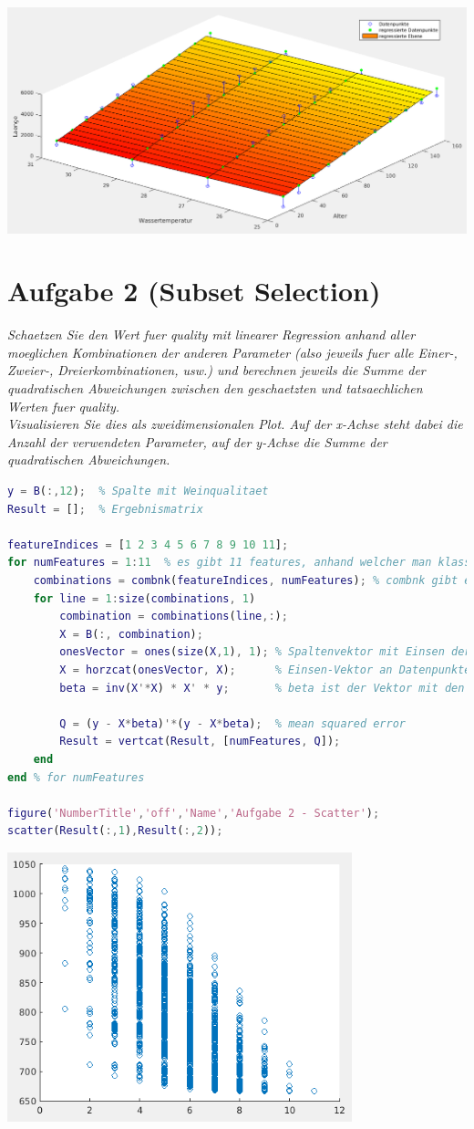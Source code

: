\documentclass[12pt]{article}
\begin{document}
\includegraphics[width=14cm]{aufg1_ebene02.png}
\newpage

\section{Aufgabe 2 (Subset Selection)}
\textit{Schaetzen Sie den Wert fuer quality mit linearer Regression anhand aller moeglichen Kombinationen der anderen Parameter (also jeweils fuer alle Einer-­, Zweier-­, Dreierkombinationen, usw.) und berechnen jeweils die Summe der quadratischen Abweichungen zwischen den geschaetzten und tatsaechlichen Werten fuer quality.\\
Visualisieren Sie dies als zweidimensionalen Plot. Auf der x-Achse steht dabei die Anzahl der verwendeten Parameter, auf der y-­Achse die Summe der quadratischen Abweichungen.}
\begin{lstlisting}[language=Matlab]
y = B(:,12);  % Spalte mit Weinqualitaet
Result = [];  % Ergebnismatrix

featureIndices = [1 2 3 4 5 6 7 8 9 10 11];
for numFeatures = 1:11  % es gibt 11 features, anhand welcher man klassifizieren kann
    combinations = combnk(featureIndices, numFeatures); % combnk gibt eine Liste aller n ueber k vielen Kombinationen von featureIndices zurueck (wobei numFeatures unser k ist)
    for line = 1:size(combinations, 1)
        combination = combinations(line,:);
        X = B(:, combination);
        onesVector = ones(size(X,1), 1); % Spaltenvektor mit Einsen der gleichen Laenge wie B
        X = horzcat(onesVector, X);      % Einsen-Vektor an Datenpunkte-Matrix drankleben
        beta = inv(X'*X) * X' * y;       % beta ist der Vektor mit den Koeffizienten der Regressionsebene
        
        Q = (y - X*beta)'*(y - X*beta);  % mean squared error
        Result = vertcat(Result, [numFeatures, Q]);
    end
end % for numFeatures

figure('NumberTitle','off','Name','Aufgabe 2 - Scatter');
scatter(Result(:,1),Result(:,2));
\end{lstlisting}
\includegraphics[width=10cm]{aufg2_subset_selection.png}
\end{document}
